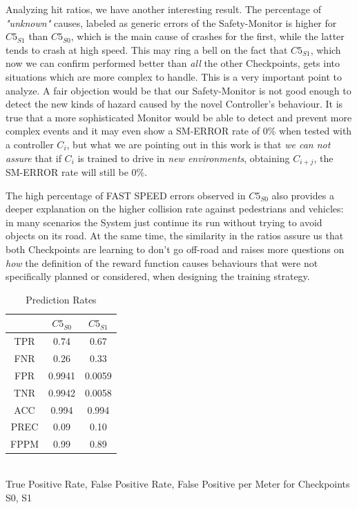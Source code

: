 Analyzing hit ratios, we have another interesting result. The percentage of \textsl{"unknown"} causes, labeled as generic errors of the Safety-Monitor is higher for $C5_{S1}$ than $C5_{S0}$, which is the main cause of crashes for the first, while the latter tends to crash at high speed. This may ring a bell on the fact that $C5_{S1}$, which now we can confirm performed better than \textsl{all} the other Checkpoints, gets into situations which are more complex to handle. This is a very important point to analyze. A fair objection would be that our Safety-Monitor is not good enough to detect the new kinds of hazard caused by the novel Controller's behaviour. It is true that a more sophisticated Monitor would be able to detect and prevent more complex events and it may even show a SM-ERROR rate of $0\%$ when tested with a controller $C_{i}$, but what we are pointing out in this work is that \textsl{we can not assure} that if $C_{i}$ is trained to drive in \textsl{new environments}, obtaining $C_{i+j}$, the SM-ERROR rate will still be $0\%$.\newline

The high percentage of FAST SPEED errors observed in $C5_{S0}$ also provides a deeper explanation on the higher collision rate against pedestrians and vehicles: in many scenarios the System just continue its run without trying to avoid objects on its road. At the same time, the similarity in the ratios assure us that both Checkpoints are learning to don't go off-road and raises more questions on \textsl{how} the definition of the reward function causes behaviours that were not specifically planned or considered, when designing the training strategy.

\vspace{0.5cm}
\begin{table}[h]
	\caption{Prediction Rates}
	\begin{center}
		\begin{tabular}{ |c|c|c| }
			\hline
			& $C5_{S0}$ & $C5_{S1}$ \\
			\hline
			TPR & 0.74 & 0.67 \\
			\hline
			FNR & 0.26 & 0.33 \\
			\hline
			FPR & 0.9941 & 0.0059 \\
			\hline
			TNR & 0.9942 & 0.0058 \\
			\hline
			ACC & 0.994 & 0.994 \\
			\hline
			PREC & 0.09 & 0.10 \\
			\hline
			FPPM & 0.99 & 0.89 \\
			\hline
		\end{tabular}
		\\
		\vspace{0.3cm}
		True Positive Rate, False Positive Rate, False Positive per Meter for Checkpoints S0, S1
	\end{center}
\end{table}

